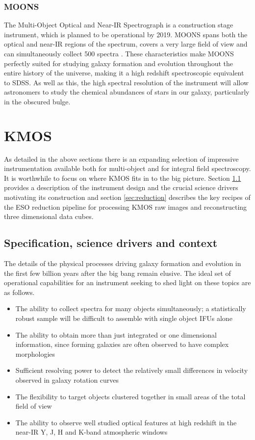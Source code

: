 \documentclass{literature}
\begin{document}
\subsubsection{MOONS}\label{subsubsec:MOONS}
The Multi-Object Optical and Near-IR Spectrograph is a construction stage instrument, which is planned to be operational by 2019. MOONS spans both the optical and near-IR regions of the spectrum, covers a very large field of view and can simultaneously collect 500 spectra \citep{Cirasuolo2011}. These characteristics make MOONS perfectly suited for studying galaxy formation and evolution throughout the entire history of the universe, making it a high redshift spectroscopic equivalent to SDSS. As well as this, the high spectral resolution of the instrument will allow astronomers to study the chemical abundances of stars in our galaxy, particularly in the obscured bulge. 


 
\section{KMOS}\label{sec:KMOS}
As detailed in the above sections there is an expanding selection of impressive instrumentation available both for multi-object and for integral field spectroscopy. It is worthwhile to focus on where KMOS fits in to the big picture. Section \ref{subsec:instrument} provides a description of the instrument design and the crucial science drivers motivating its construction and section \ref{sec:reduction} describes the key recipes of the ESO reduction pipeline for processing KMOS raw images and reconstructing three dimensional data cubes. 

\subsection{Specification, science drivers and context}\label{subsec:instrument}
The details of the physical processes driving galaxy formation and evolution in the first few billion years after the big bang remain elusive. The ideal set of operational capabilities for an instrument seeking to shed light on these topics are as follows. 
\begin{itemize}
	\item The ability to collect spectra for many objects simultaneously; a statistically robust sample will be difficult to assemble with single object IFUs alone 
	\item The ability to obtain more than just integrated or one dimensional information, since forming galaxies are often observed to have complex morphologies 
	\item Sufficient resolving power to detect the relatively small differences in velocity observed in galaxy rotation curves
	\item The flexibility to target objects clustered together in small areas of the total field of view 
	\item The ability to observe well studied optical features at high redshift in the near-IR Y, J, H and K-band atmospheric windows    
\end{itemize}
\end{document}

